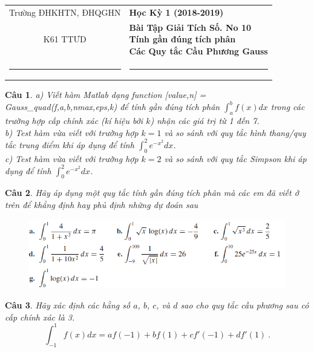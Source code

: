 \documentclass[11pt]{article}
\newtheorem{bt}{Câu}
\begin{document}
\begin{tabular*}
{\linewidth}{c>{\centering\hspace{0pt}} p{}}
Trường ĐHKHTN, ĐHQGHN & {\bf Học Kỳ 1 (2018-2019)}
\tabularnewline
K61 TTƯD & {\bf Bài Tập Giải Tích Số. No 10 \\ Tính gần đúng tích phân \\ Các Quy tắc Cầu Phương Gauss}
\tabularnewline
\rule{1in}{1pt}  \small  & \rule{2in}{1pt} %
\tabularnewline


\end{tabular*}
%

\begin{bt}
a) Viết hàm Matlab dạng \emph{function [value,n] = Gauss\_quad(f,a,b,nmax,eps,k)} để tính gần đúng tích phân $\int_{a}^{b} f(x)dx$ trong các trường hợp cấp chính xác (kí hiệu bởi $k$) nhận các giá trị từ 1 đến 7. \\
b) Test hàm vừa viết với trường hợp $k=1$ và so sánh với quy tắc hình thang/quy tắc trung điểm khi áp dụng để tính $\int_{0}^{2} e^{-x^2}dx$.\\
c) Test hàm vừa viết với trường hợp $k=2$ và so sánh với quy tắc Simpson khi áp dụng để tính $\int_{0}^{2} e^{-x^2}dx$.
\end{bt}

\begin{bt}
Hãy áp dụng một quy tắc tính gần đúng tích phân mà các em đã viết ở trên để khẳng định hay phủ định những dự đoán sau
\begin{figure}[h!]
	\centering
	\includegraphics[width=0.9\linewidth]{1}
	\label{fig:1}
\end{figure}
\end{bt}

\begin{bt} %
Hãy xác định các hằng số $a$, $b$, $c$, và $d$ sao cho quy tắc cầu phương sau có cấp chính xác là 3.
%
\[ \int_{-1}^{1} f(x) dx = a f(-1) + bf (1) + cf'(-1) + df'(1) \ .
 \]
%
\end{bt}
\end{document}
